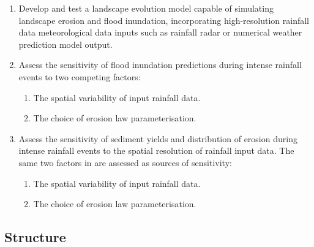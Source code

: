 \begin{enumerate}
\item Develop and test a landscape evolution model capable of simulating landscape erosion and flood inundation, incorporating high-resolution rainfall data meteorological data inputs such as rainfall radar or numerical weather prediction model output. %

\item Assess the sensitivity of flood inundation predictions during intense rainfall events to two competing factors:
\begin{enumerate}
\item The spatial variability of input rainfall data.
\item The choice of erosion law parameterisation.
\end{enumerate}

\item Assess the sensitivity of sediment yields and distribution of erosion during intense rainfall events to the spatial resolution of rainfall input data. The same two factors in are assessed as sources of sensitivity:
\begin{enumerate}
\item The spatial variability of input rainfall data.
\item The choice of erosion law parameterisation.
\end{enumerate}
\end{enumerate}

\subsection{Structure}

